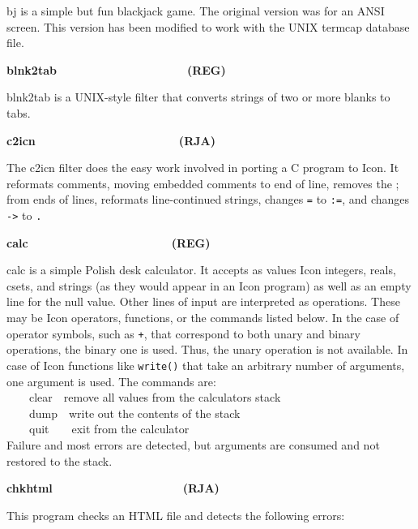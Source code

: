 \textsf{bj} is a simple but fun blackjack game. The original version was
for an ANSI screen. This version has been modified to work with the
UNIX termcap database file.

{\sffamily\bfseries
blnk2tab\ \ \ \ \ \ \ \ \ \ \ \ \ \ \ \ \ \ \ \ (REG)}

\textsf{blnk2tab} is a UNIX-style filter that converts strings of two or
more blanks to tabs.

{\sffamily\bfseries
c2icn\ \ \ \ \ \ \ \ \ \ \ \ \ \ \ \ \ \ \ \ \ \ (RJA)}

The \textsf{c2icn} filter does the easy work involved in porting a C
program to Icon. It reformats comments, moving embedded
comments to end of line, removes the {\textquotedbl};{\textquotedbl}
from ends of lines, reformats line-continued strings, changes
\texttt{=} to \texttt{:=}, and changes \texttt{{}-{\textgreater}} to
\texttt{.} 

{\sffamily\bfseries
calc\ \ \ \ \ \ \ \ \ \ \ \ \ \ \ \ \ \ \ \ \ \ (REG)}

\textsf{calc} is a simple Polish {\textquotedbl}desk
calculator{\textquotedbl}. It accepts as values Icon integers, reals,
csets, and strings (as they would appear in an Icon program) as well as
an empty line for the null value. Other lines of input are interpreted
as operations. These may be Icon operators, functions, or the commands
listed below. In the case of operator symbols, such as \texttt{+}, that
correspond to both unary and binary operations, the binary one is used.
Thus, the unary operation is not available. In case of Icon functions
like \texttt{write()} that take an arbitrary number of arguments, one
argument is used. The commands are:\\
 \ \ \ \ clear\ \ remove all values from the
calculator{\textquotesingle}s stack\\
 \ \ \ \ dump\ \ write out the contents of the stack\\
 \ \ \ \ quit\ \ \ \ exit from the calculator\\
Failure and most errors are detected, but arguments are consumed and not
restored to the stack.

{\sffamily\bfseries
chkhtml\ \ \ \ \ \ \ \ \ \ \ \ \ \ \ \ \ \ \ \ (RJA)}

This program checks an HTML file and detects the following
errors:

